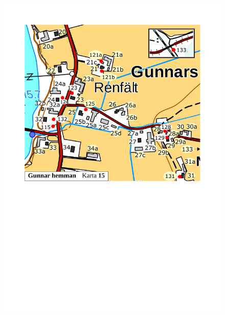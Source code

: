 \begin{figure}[htbp]
  \centering
  \includegraphics[width=1\textwidth]{kartor/Karta15.pdf}
  \label{map:15}
\end{figure}

